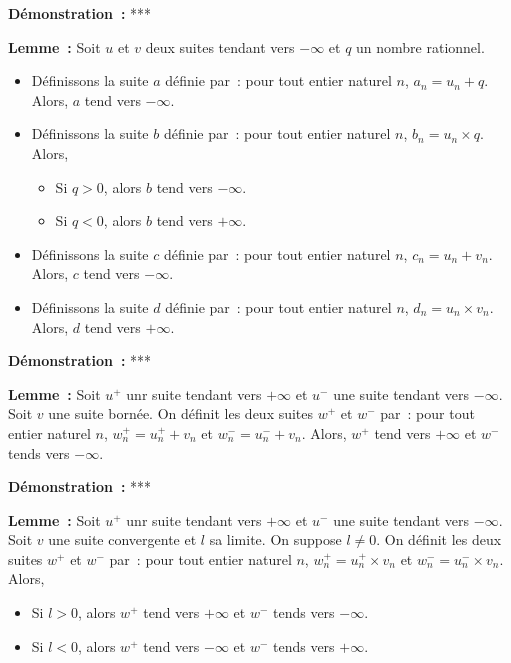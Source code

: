 \medskip

\noindent\textbf{Démonstration :} ***

\medskip

\noindent\textbf{Lemme :} Soit $u$ et $v$ deux suites tendant vers $-\infty$ et $q$ un nombre rationnel.
    \begin{itemize}[nosep]
        \item Définissons la suite $a$ définie par : pour tout entier naturel $n$, $a_n = u_n + q$.
            Alors, $a$ tend vers $-\infty$.
        \item Définissons la suite $b$ définie par : pour tout entier naturel $n$, $b_n = u_n \times q$.
            Alors, 
            \begin{itemize}[nosep]
                \item Si $q > 0$, alors $b$ tend vers $-\infty$.
                \item Si $q < 0$, alors $b$ tend vers $+\infty$.
            \end{itemize}
        \item Définissons la suite $c$ définie par : pour tout entier naturel $n$, $c_n = u_n + v_n$.
            Alors, $c$ tend vers $-\infty$.
        \item Définissons la suite $d$ définie par : pour tout entier naturel $n$, $d_n = u_n \times v_n$.
            Alors, $d$ tend vers $+\infty$.
    \end{itemize}

\medskip

\noindent\textbf{Démonstration :} ***

\medskip

\noindent\textbf{Lemme :} Soit $u^+$ unr suite tendant vers $+\infty$ et $u^-$ une suite tendant vers $-\infty$.
    Soit $v$ une suite bornée.
    On définit les deux suites $w^+$ et $w^-$ par : pour tout entier naturel $n$, $w^+_n = u^+_n + v_n$ et $w^-_n = u^ -_n + v_n$.
    Alors, $w^+$ tend vers $+\infty$ et $w^-$ tends vers $-\infty$.

\medskip

\noindent\textbf{Démonstration :} ***

\medskip

\noindent\textbf{Lemme :} Soit $u^+$ unr suite tendant vers $+\infty$ et $u^-$ une suite tendant vers $-\infty$.
    Soit $v$ une suite convergente et $l$ sa limite.
    On suppose $l \neq 0$.
    On définit les deux suites $w^+$ et $w^-$ par : pour tout entier naturel $n$, $w^+_n = u^+_n \times v_n$ et $w^-_n = u^ -_n \times v_n$.
    Alors, 
    \begin{itemize}[nosep]
        \item Si $l > 0$, alors $w^+$ tend vers $+\infty$ et $w^-$ tends vers $-\infty$.
        \item Si $l < 0$, alors $w^+$ tend vers $-\infty$ et $w^-$ tends vers $+\infty$.
    \end{itemize}


